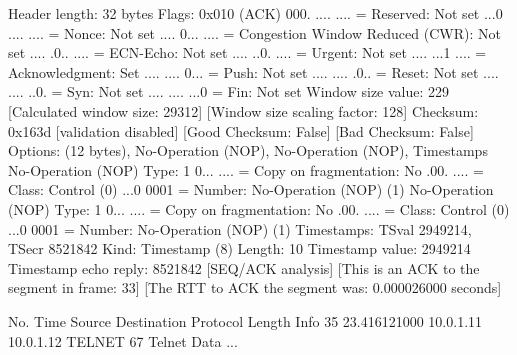     Header length: 32 bytes
    Flags: 0x010 (ACK)
        000. .... .... = Reserved: Not set
        ...0 .... .... = Nonce: Not set
        .... 0... .... = Congestion Window Reduced (CWR): Not set
        .... .0.. .... = ECN-Echo: Not set
        .... ..0. .... = Urgent: Not set
        .... ...1 .... = Acknowledgment: Set
        .... .... 0... = Push: Not set
        .... .... .0.. = Reset: Not set
        .... .... ..0. = Syn: Not set
        .... .... ...0 = Fin: Not set
    Window size value: 229
    [Calculated window size: 29312]
    [Window size scaling factor: 128]
    Checksum: 0x163d [validation disabled]
        [Good Checksum: False]
        [Bad Checksum: False]
    Options: (12 bytes), No-Operation (NOP), No-Operation (NOP), Timestamps
        No-Operation (NOP)
            Type: 1
                0... .... = Copy on fragmentation: No
                .00. .... = Class: Control (0)
                ...0 0001 = Number: No-Operation (NOP) (1)
        No-Operation (NOP)
            Type: 1
                0... .... = Copy on fragmentation: No
                .00. .... = Class: Control (0)
                ...0 0001 = Number: No-Operation (NOP) (1)
        Timestamps: TSval 2949214, TSecr 8521842
            Kind: Timestamp (8)
            Length: 10
            Timestamp value: 2949214
            Timestamp echo reply: 8521842
    [SEQ/ACK analysis]
        [This is an ACK to the segment in frame: 33]
        [The RTT to ACK the segment was: 0.000026000 seconds]

No.     Time           Source                Destination           Protocol Length Info
     35 23.416121000   10.0.1.11             10.0.1.12             TELNET   67     Telnet Data ...

